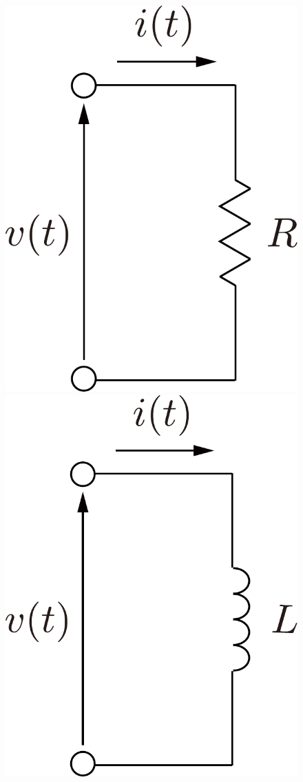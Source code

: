 \documentclass[graybox, envcountchap]{svmult}
\begin{document}
\newpage
\begin{figure}[t]
  \centering
  {
    \begin{minipage}{0.3\linewidth}
      \centering
      \includegraphics[width = .7\linewidth]{figs/circres2}
      \subcaption{}
      \medskip
    \end{minipage}
    \begin{minipage}{0.3\linewidth}
      \centering
      \includegraphics[width = .7\linewidth]{figs/circcoil}

\end{minipage}}
\end{figure}
\end{document}
